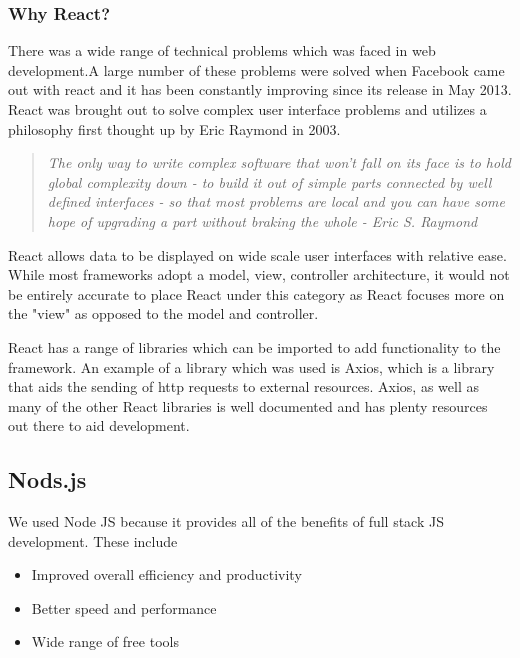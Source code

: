 \subsubsection{Why React?}
There was a wide range of technical problems which was faced in web development.A large number of these problems were solved when Facebook came out with react and it has been constantly improving since its release in May 2013. \cite{IntroductionReact}React was brought out to solve complex user interface problems and utilizes a philosophy first thought up by Eric Raymond in 2003.

\begin{quote}
\emph{The only way to write complex software that won't fall on its face is to hold global complexity down - to build it out of simple parts connected by well defined interfaces - so that most problems are local and you can have some hope of upgrading a part without braking the whole - Eric S. Raymond} \cite{ArtOfUnix}
\end{quote}

\cite{IntroductionReact}React allows data to be displayed on wide scale user interfaces with relative ease. While most frameworks adopt a model, view, controller architecture, it would not be entirely accurate to place React under this category as React focuses more on the "view" as opposed to the model and controller. \par
React has a range of libraries which can be imported to add functionality to the framework. An example of a library which was used is Axios, which is a library that aids the sending of http requests to external resources. \cite{Axios}Axios, as well as many of the other React libraries is well documented and has plenty resources out there to aid development.

\subsection{Nods.js}
We used Node JS because it provides all of the benefits of \cite{fullStackJS}full stack JS development. These include

\begin{itemize}
    \item Improved overall efficiency and productivity
    \item Better speed and performance
    \item Wide range of free tools
\end{itemize}


